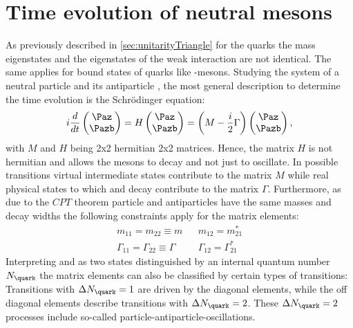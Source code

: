 \section[head={Time evolution of neutral mesons},tocentry={Time evolution of neutral mesons}]{Time evolution of neutral mesons}
\label{sec:TimeEvolution}

As previously described in \cref{sec:unitarityTriangle} for the quarks the mass eigenstates and the eigenstates of the weak interaction are not identical.
The same applies for bound states of quarks like \B-mesons.
Studying the system of a neutral particle \Paz and its antiparticle \Pazb, the most general description to determine the time evolution is the Schrödinger equation:
\begin{equation}
i\frac{d}{dt}\begin{pmatrix} \Paz \\ \Pazb \end{pmatrix} = H \begin{pmatrix} \Paz \\ \Pazb \end{pmatrix}
=\left(M-\frac{i}{2}\Gamma\right)\begin{pmatrix} \Paz \\ \Pazb \end{pmatrix}, \label{eq:mixMatrix}
\end{equation}
with $M$ and $H$ being 2x2 hermitian 2x2 matrices.
Hence, the matrix $H$ is not hermitian and allows the \B mesons to decay and not just to oscillate.
In possible transitions virtual intermediate states contribute to the matrix $M$ while real physical states to which \Paz and \Pazb decay contribute to the matrix $\Gamma$.
Furthermore, as due to the $CPT$ theorem particle and antiparticles have the same masses and decay widths the following constraints apply for the matrix elements:
\begin{equation}
\begin{aligned}
&m_{11}=m_{22}\equiv m&&m_{12}=m_{21}^\ast&\\
&\Gamma_{11}=\Gamma_{22}\equiv\Gamma&&\Gamma_{12}=\Gamma_{21}^\ast&
\end{aligned}
\end{equation}
Interpreting \Paz and \Pazb as two states distinguished by an internal quantum number $N_\quark$ the matrix elements can also be classified by certain types of transitions:
Transitions with $\Delta N_\quark=1$ are driven by the diagonal elements, while the off diagonal elements describe transitions with $\Delta N_\quark=2$.
These $\Delta N_\quark=2$ processes include so-called particle-antiparticle-oscillations.

